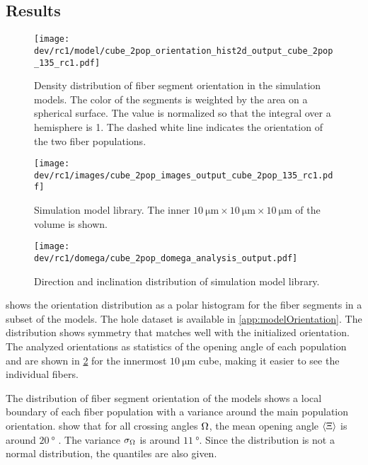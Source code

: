 \subsection{Results}
%
\begin{figure}[!t]
\centering
\texttt{[image: dev/rc1/model/cube\_2pop\_orientation\_hist2d\_output\_cube\_2pop\_135\_rc1.pdf]}
\caption{Density distribution of fiber segment orientation in the simulation models. The color of the segments is weighted by the area on a spherical surface. The value is normalized so that the integral over a hemisphere is 1. The dashed white line indicates the orientation of the two fiber populations.}
\label{fig:modelOrientation}
\end{figure}
%
\begin{figure}[!t]
\centering
\texttt{[image: dev/rc1/images/cube\_2pop\_images\_output\_cube\_2pop\_135\_rc1.pdf]}
\caption[solved model images]{Simulation model library. The inner $\SI{10}{\micro\meter} \times \SI{10}{\micro\meter} \times \SI{10}{\micro\meter}$ of the volume is shown.}
\label{fig:modelImages}
\end{figure}
%
\begin{figure}[!t]
    \centering
    \texttt{[image: dev/rc1/domega/cube\_2pop\_domega\_analysis\_output.pdf]}
    \caption{Direction and inclination distribution of simulation model library. }
\end{figure}
%
 shows the orientation distribution as a polar histogram for the fiber segments in a subset of the models.
The hole dataset is available in \cref{app:modelOrientation}.
The distribution shows symmetry that matches well with the initialized orientation.
The analyzed orientations as statistics of the opening angle of each population \popa and \popb are shown in \cref{fig:modelImages} for the innermost $\SI{10}{\micro\meter}$ cube, making it easier to see the individual fibers.
\par
%
The distribution of fiber segment orientation of the models shows a local boundary of each fiber population with a variance around the main population orientation.
 show that for all crossing angles $\textnormal{$\Omega$}$, the mean opening angle $\langle \textnormal{$\Xi$}
 \rangle$ is around $\SI{20}{\degree}$ .
The variance $\sigma_{\textnormal{$\Omega$}}$ is around $\SI{11}{\degree}$.
Since the distribution is not a normal distribution, the quantiles are also given.
